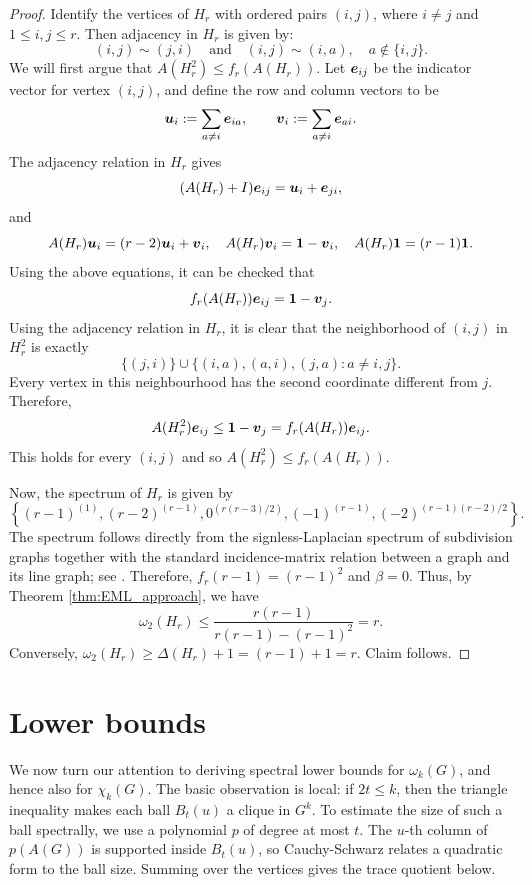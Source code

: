 \documentclass[10pt,a4paper]{article}
\theoremstyle{plain}
\numberwithin{equation}{section}
\def\e{\mbox{\boldmath $e$}}
\def\uvec{\mbox{\boldmath $u$}}
\def\vvec{\mbox{\boldmath $v$}}
\def\1{\mbox{\boldmath $1$}}
\begin{document}
\begin{proof}
Identify the vertices of $H_r$ with ordered pairs $(i,j)$, where $i\ne j$ and $1\le i,j\le r$. Then adjacency in $H_r$ is given by:
\[ (i,j)\sim (j,i)\quad \text{and}\quad (i,j)\sim (i,a), \quad a\notin \{i,j\}.\]
We will first argue that $A(H_r^2)\le f_r(A(H_r))$. Let $\e_{ij}$ be the indicator vector for vertex $(i,j)$, and define the row and column vectors to be 
\[ \uvec_i:= \sum_{a\ne i}\e_{ia}, \qquad \vvec_i := \sum_{a\ne i}\e_{ai}.\]
The adjacency relation in $H_r$ gives
\begin{equation}
    (A(H_r)+I)\e_{ij} = \uvec_i + \e_{ji},
\end{equation}
and 
\begin{equation}
    A(H_r)\uvec_i = (r-2)\uvec_i + \vvec_i, \quad A(H_r)\vvec_i = \1 - \vvec_i, \quad A(H_r)\1 = (r-1)\1. 
\end{equation}
Using the above equations, it can be checked that
\[ f_r(A(H_r))\e_{ij} = \1 - \vvec_{j}.\]
Using the adjacency relation in $H_r$, it is clear that the neighborhood of $(i,j)$ in $H_r^2$ is exactly 
\[\{(j, i)\}\cup \{(i, a), (a, i), (j, a): a\ne i,j\}.\]
Every vertex in this neighbourhood has the second coordinate different from $j$. Therefore, 
\[A(H_r^2)\e_{ij} \le \1 - \vvec_j = f_r(A(H_r))\e_{ij}.\]
This holds for every $(i,j)$ and so $A(H_r^2)\le f_r(A(H_r))$.

Now, the spectrum of $H_r$ is given by 
\[\left\{(r-1)^{(1)}, (r-2)^{(r-1)}, 0^{(r(r-3)/2)}, (-1)^{(r-1)}, (-2)^{(r-1)(r-2)/2}\right\}.\] 
The spectrum follows directly from the signless-Laplacian spectrum of subdivision graphs together with the standard incidence-matrix relation between a graph and its line graph; see \cite{Barik_Kalita_Pati_Sahoo_2018}. Therefore, $f_r(r-1) = (r-1)^2$ and $\beta = 0$. Thus, by Theorem \ref{thm:EML_approach}, we have 
\[\omega_2(H_r) \le \frac{r(r-1)}{r(r-1) - (r-1)^2} = r.\]
Conversely, $\omega_2(H_r)\ge \Delta(H_r) + 1 = (r-1) + 1 = r$. Claim follows. 
\end{proof}

\section{Lower bounds}\label{sec:lower_bounds}


We now turn our attention to deriving spectral lower bounds for $\omega_k(G)$, and hence also for $\chi_k(G)$. The basic observation is local: if $2t\le k$, then the triangle inequality makes each ball $B_t(u)$ a clique in $G^k$. To estimate the size of such a ball spectrally, we use a polynomial $p$ of degree at most $t$. The $u$-th column of $p(A(G))$ is supported inside $B_t(u)$, so Cauchy-Schwarz relates a quadratic form to the ball size. Summing over the vertices gives the trace quotient below.
\end{document}
